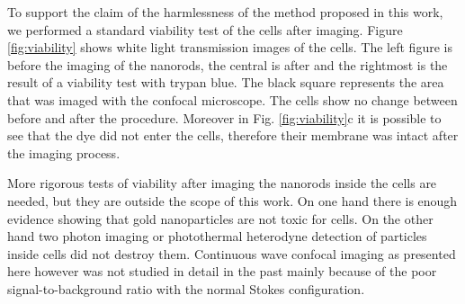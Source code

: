 To support the claim of the harmlessness of the method proposed in this
work, we performed a standard viability test of the cells after imaging. Figure
\ref{fig:viability} shows white light transmission images of the cells. The left
figure is before the imaging of the nanorods, the central is after and the
rightmost is the result of a viability test with trypan blue. The black square
represents the area that was imaged with the confocal microscope. The cells show
no change between before and after the procedure. Moreover in Fig.
\ref{fig:viability}c it is possible to see that the dye did not enter the cells,
therefore their membrane was intact after the imaging process. 

More rigorous tests of viability after imaging the nanorods inside the cells are
needed, but they are outside the scope of this work. On one hand there is enough
evidence showing that gold nanoparticles are not toxic for
cells\cite{Huff2007,Lewinski2008}. On the other hand two photon
imaging\cite{VandenBroek2013} or photothermal heterodyne
detection\cite{Leduc2013} of particles inside cells did not destroy them.
Continuous wave confocal imaging as presented here however was not studied in
detail in the past mainly because of the poor signal-to-background ratio with
the normal Stokes configuration.

